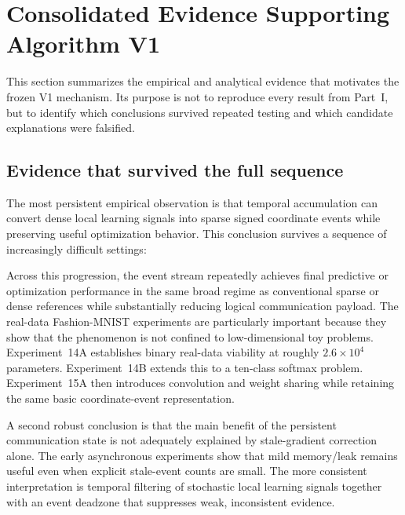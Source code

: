 \section{Consolidated Evidence Supporting Algorithm V1}
\label{sec:consolidated-evidence}

This section summarizes the empirical and analytical evidence that motivates the frozen V1 mechanism. Its purpose is not to reproduce every result from Part~I, but to identify which conclusions survived repeated testing and which candidate explanations were falsified.

\subsection{Evidence that survived the full sequence}

The most persistent empirical observation is that temporal accumulation can convert dense local learning signals into sparse signed coordinate events while preserving useful optimization behavior. This conclusion survives a sequence of increasingly difficult settings:
\begin{center}
\end{center}

Across this progression, the event stream repeatedly achieves final predictive or optimization performance in the same broad regime as conventional sparse or dense references while substantially reducing logical communication payload. The real-data Fashion-MNIST experiments are particularly important because they show that the phenomenon is not confined to low-dimensional toy problems. Experiment~14A establishes binary real-data viability at roughly $2.6\times10^4$ parameters. Experiment~14B extends this to a ten-class softmax problem. Experiment~15A then introduces convolution and weight sharing while retaining the same basic coordinate-event representation.

A second robust conclusion is that the main benefit of the persistent communication state is not adequately explained by stale-gradient correction alone. The early asynchronous experiments show that mild memory/leak remains useful even when explicit stale-event counts are small. The more consistent interpretation is temporal filtering of stochastic local learning signals together with an event deadzone that suppresses weak, inconsistent evidence.

